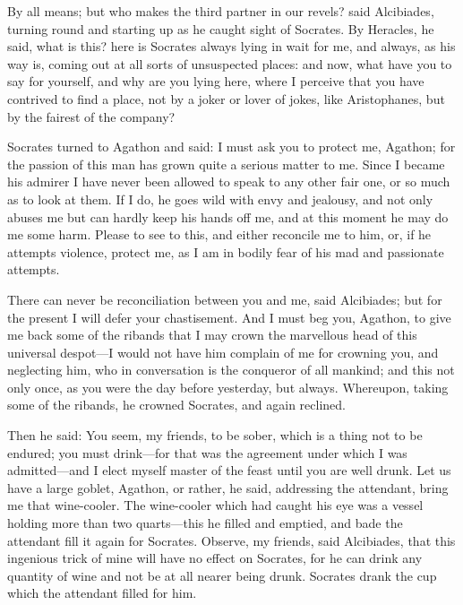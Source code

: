 \documentclass[11pt,letter]{article}
\begin{document}
\par  By all means; but who makes the third partner in our revels? said Alcibiades, turning round and starting up as he caught sight of Socrates. By Heracles, he said, what is this? here is Socrates always lying in wait for me, and always, as his way is, coming out at all sorts of unsuspected places: and now, what have you to say for yourself, and why are you lying here, where I perceive that you have contrived to find a place, not by a joker or lover of jokes, like Aristophanes, but by the fairest of the company?

\par  Socrates turned to Agathon and said: I must ask you to protect me, Agathon; for the passion of this man has grown quite a serious matter to me. Since I became his admirer I have never been allowed to speak to any other fair one, or so much as to look at them. If I do, he goes wild with envy and jealousy, and not only abuses me but can hardly keep his hands off me, and at this moment he may do me some harm. Please to see to this, and either reconcile me to him, or, if he attempts violence, protect me, as I am in bodily fear of his mad and passionate attempts.

\par  There can never be reconciliation between you and me, said Alcibiades; but for the present I will defer your chastisement. And I must beg you, Agathon, to give me back some of the ribands that I may crown the marvellous head of this universal despot—I would not have him complain of me for crowning you, and neglecting him, who in conversation is the conqueror of all mankind; and this not only once, as you were the day before yesterday, but always. Whereupon, taking some of the ribands, he crowned Socrates, and again reclined.

\par  Then he said: You seem, my friends, to be sober, which is a thing not to be endured; you must drink—for that was the agreement under which I was admitted—and I elect myself master of the feast until you are well drunk. Let us have a large goblet, Agathon, or rather, he said, addressing the attendant, bring me that wine-cooler. The wine-cooler which had caught his eye was a vessel holding more than two quarts—this he filled and emptied, and bade the attendant fill it again for Socrates. Observe, my friends, said Alcibiades, that this ingenious trick of mine will have no effect on Socrates, for he can drink any quantity of wine and not be at all nearer being drunk. Socrates drank the cup which the attendant filled for him.
\end{document}
